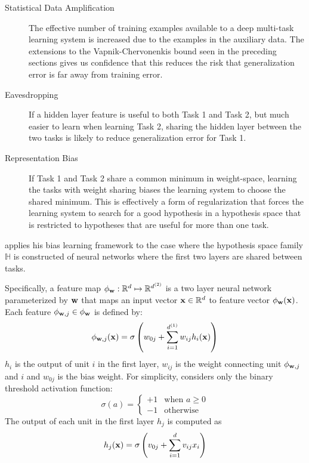 \begin{description}
	\item [Statistical Data Amplification] The effective number of training examples available to a deep multi-task learning system is increased due to the examples in the auxiliary data. The extensions to the Vapnik-Chervonenkis bound seen in the preceding sections gives us confidence that this reduces the risk that generalization error is far away from training error.
	\item [Eavesdropping] If a hidden layer feature is useful to both Task 1 and Task 2, but much easier to learn when learning Task 2, sharing the hidden layer between the two tasks is likely to reduce generalization error for Task 1.
	\item [Representation Bias] If Task 1 and Task 2 share a common minimum in weight-space, learning the tasks with weight sharing biases the learning system to choose the shared minimum. This is effectively a form of regularization that forces the learning system to search for a good hypothesis in a hypothesis space that is restricted to hypotheses that are useful for more than one task.
\end{description}
\noindent
\citet{baxter2000} applies his bias learning framework to the case where the hypothesis space family $\mathbb{H}$ is constructed of neural networks where the first two layers are shared between tasks.

Specifically, a feature map $\phi_{\mathbf{w}}:\mathbb{R}^d\mapsto\mathbb{R}^{d^{(2)}}$ is a two layer neural network parameterized by $\mathbf{w}$ that maps an input vector $\mathbf{x} \in \mathbb{R}^d$ to feature vector $\phi_{\mathbf{w}}(\mathbf{x})$. Each feature $\phi_{\mathbf{w},j} \in \phi_{\mathbf{w}}$ is defined by:
$$
\phi_{\mathbf{w},j}(\mathbf{x}) = \sigma\left( w_{0j} + \sum\limits_{i=1}^{d^{(1)}} w_{ij}h_i(\mathbf{x}) \right)
$$
\noindent
$h_{i}$ is the output of unit $i$ in the first layer, $w_{ij}$ is the weight connecting unit $\phi_{\mathbf{w},j}$ and $i$ and $w_{0j}$ is the bias weight. For simplicity, \citet{baxter2000} considers only the binary threshold activation function:
$$
\sigma(a) = \begin{cases}
	+1 & \text{when } a \geq 0 \\
	-1 & \text{otherwise}
\end{cases}
$$
The output of each unit in the first layer $h_j$ is computed as
$$
h_j(\mathbf{x}) = \sigma\left( v_{0j} + \sum\limits_{i=1}^{d} v_{ij}x_{i} \right)
$$

